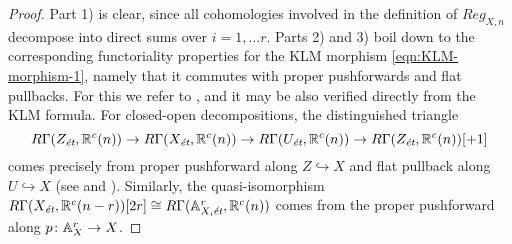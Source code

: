 \documentclass{article}
\numberwithin{equation}{section}
\begin{document}
\begin{lemma}
  \begin{proof}
    Part 1) is clear, since all cohomologies involved in the definition of
    $Reg_{X,n}$ decompose into direct sums over $i = 1,\ldots r$.
    Parts 2) and 3) boil down to the corresponding functoriality properties
    for the KLM morphism \eqref{eqn:KLM-morphism-1}, namely that it commutes
    with proper pushforwards and flat pullbacks. For this we refer to
    \cite[Lemma~3, Lemma~4]{Weisschuh-2017}, and it may be also verified
    directly from the KLM formula. For closed-open decompositions,
    the distinguished triangle
    \[ R\Gamma (Z_\et, \RR^c (n)) \to R\Gamma (X_\et, \RR^c (n)) \to
      R\Gamma (U_\et, \RR^c (n)) \to R\Gamma (Z_\et, \RR^c (n)) [+1] \]
    comes precisely from proper pushforward along $Z \hookrightarrow X$ and flat
    pullback along $U \hookrightarrow X$ (see \cite[Corollary~7.2]{Geisser-2010}
    and \cite[\S 3]{Bloch-1986}). Similarly, the quasi-isomorphism
    $R\Gamma (X_\et, \RR^c (n-r)) [2r] \cong R\Gamma (\AA^r_{X,\et}, \RR^c (n))$
    comes from the proper pushforward along $p\colon \AA^r_X \to X$.
  \end{proof}
\end{lemma}
\end{document}
